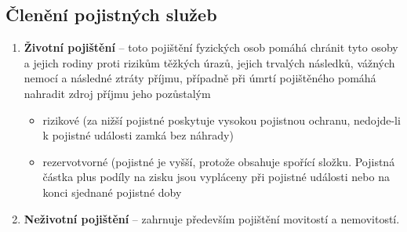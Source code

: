 \subsection*{Členění pojistných služeb}

\begin{enumerate}
    \item \textbf{Životní pojištění} -- toto pojištění fyzických osob pomáhá chránit tyto osoby a jejich rodiny proti rizikům těžkých úrazů, jejich trvalých následků, vážných nemocí a následné ztráty příjmu, případně při úmrtí pojištěného pomáhá nahradit zdroj příjmu jeho pozůstalým 
        \begin{itemize}
            \item rizikové (za nižší pojistné poskytuje vysokou pojistnou ochranu, nedojde-li k pojistné události zamká bez náhrady)
            \item rezervotvorné (pojistné je vyšší, protože obsahuje spořící složku. Pojistná částka plus podíly na zisku jsou vypláceny při pojistné události nebo na konci sjednané pojistné doby    
        \end{itemize}
    \item \textbf{Neživotní pojištění} -- zahrnuje především pojištění movitostí a nemovitostí.
\end{enumerate}
        
